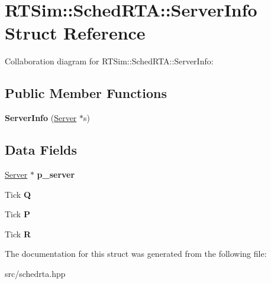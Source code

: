 \hypertarget{structRTSim_1_1SchedRTA_1_1ServerInfo}{}\section{R\+T\+Sim\+:\+:Sched\+R\+TA\+:\+:Server\+Info Struct Reference}
\label{structRTSim_1_1SchedRTA_1_1ServerInfo}


Collaboration diagram for R\+T\+Sim\+:\+:Sched\+R\+TA\+:\+:Server\+Info\+:
\subsection*{Public Member Functions}
\begin{DoxyCompactItemize}
\item 
{\bfseries Server\+Info} (\hyperlink{classRTSim_1_1Server}{Server} $\ast$s)\hypertarget{structRTSim_1_1SchedRTA_1_1ServerInfo_af4a0caa70a6dadfa3aa3e9a786b262a5}{}\label{structRTSim_1_1SchedRTA_1_1ServerInfo_af4a0caa70a6dadfa3aa3e9a786b262a5}

\end{DoxyCompactItemize}
\subsection*{Data Fields}
\begin{DoxyCompactItemize}
\item 
\hyperlink{classRTSim_1_1Server}{Server} $\ast$ {\bfseries p\+\_\+server}\hypertarget{structRTSim_1_1SchedRTA_1_1ServerInfo_a8b484a9a06fd62b9d58f7bd9ae7fdd50}{}\label{structRTSim_1_1SchedRTA_1_1ServerInfo_a8b484a9a06fd62b9d58f7bd9ae7fdd50}

\item 
Tick {\bfseries Q}\hypertarget{structRTSim_1_1SchedRTA_1_1ServerInfo_ab4c50fc38367a141cd73a8183e6eea81}{}\label{structRTSim_1_1SchedRTA_1_1ServerInfo_ab4c50fc38367a141cd73a8183e6eea81}

\item 
Tick {\bfseries P}\hypertarget{structRTSim_1_1SchedRTA_1_1ServerInfo_a52c13e1568c74538bbdef03301f497b2}{}\label{structRTSim_1_1SchedRTA_1_1ServerInfo_a52c13e1568c74538bbdef03301f497b2}

\item 
Tick {\bfseries R}\hypertarget{structRTSim_1_1SchedRTA_1_1ServerInfo_a03b28de08d412fc6f30fc62ff8162658}{}\label{structRTSim_1_1SchedRTA_1_1ServerInfo_a03b28de08d412fc6f30fc62ff8162658}

\end{DoxyCompactItemize}


The documentation for this struct was generated from the following file\+:\begin{DoxyCompactItemize}
\item 
src/schedrta.\+hpp\end{DoxyCompactItemize}
